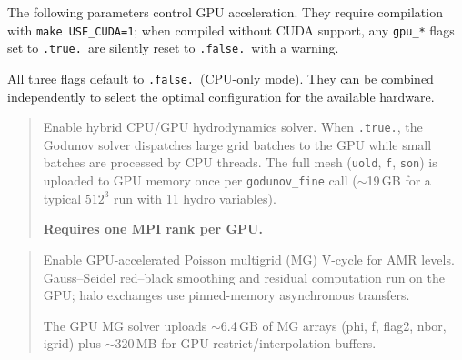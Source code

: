 The following parameters control GPU acceleration.  They require
compilation with \texttt{make USE\_CUDA=1}; when compiled without CUDA
support, any \texttt{gpu\_*} flags set to \texttt{.true.}\ are
silently reset to \texttt{.false.}\ with a warning.

All three flags default to \texttt{.false.}\ (CPU-only mode).  They
can be combined independently to select the optimal configuration for
the available hardware.

\label{param:gpu_hydro}

\begin{quote}
Enable hybrid CPU/GPU hydrodynamics solver.  When \texttt{.true.}, the
Godunov solver dispatches large grid batches to the GPU while small
batches are processed by CPU threads.  The full mesh
(\texttt{uold}, \texttt{f}, \texttt{son}) is uploaded to GPU memory
once per \texttt{godunov\_fine} call ($\sim$19\,GB for a typical
$512^3$ run with 11 hydro variables).

\textbf{Requires one MPI rank per GPU.}

\end{quote}

\label{param:gpu_poisson}

\begin{quote}
Enable GPU-accelerated Poisson multigrid (MG) V-cycle for AMR levels.
Gauss--Seidel red--black smoothing and residual computation run on the
GPU; halo exchanges use pinned-memory asynchronous transfers.

The GPU MG solver uploads $\sim$6.4\,GB of MG arrays (phi, f, flag2,
nbor, igrid) plus $\sim$320\,MB for GPU restrict/interpolation
buffers.

\end{quote}


